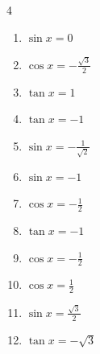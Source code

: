 \begin{multicols}{4}
\begin{enumerate}
  \item $\displaystyle \sin{x}  = 0$


  \item $\displaystyle \cos{x}  = -\frac{\sqrt{3}}{2}$


  \item $\displaystyle \tan{x}  = 1$


  \item $\displaystyle \tan{x}  = -1$


  \item $\displaystyle \sin{x}  = -\frac{1}{\sqrt{2}}$


  \item $\displaystyle \sin{x}  = -1$


  \item $\displaystyle \cos{x}  = -\frac{1}{2}$


\columnbreak %

  \item $\displaystyle \tan{x}  = -1$


  \item $\displaystyle \cos{x}  = -\frac{1}{2}$


  \item $\displaystyle \cos{x}  = \frac{1}{2}$


  \item $\displaystyle \sin{x}  = \frac{\sqrt{3}}{2}$


  \item $\displaystyle \tan{x}  = -\sqrt{3}$


\end{enumerate}
\end{multicols}
